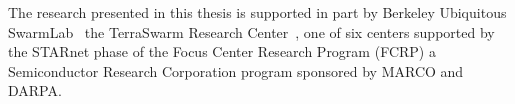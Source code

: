 \documentclass[thesis.tex]{subfiles}
\begin{document}
The research presented in this thesis is supported in part by Berkeley
Ubiquitous SwarmLab~\cite{swarmlab} the TerraSwarm Research
Center~\cite{terraswarm}, one of six centers supported by the STARnet phase of
the Focus Center Research Program (FCRP) a Semiconductor Research Corporation
program sponsored by MARCO and DARPA.
\end{document}

